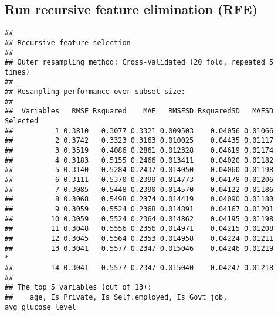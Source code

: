 \documentclass[
]{article}
\newenvironment{Shaded}{\begin{snugshade}}{\end{snugshade}}
\newcommand{\AttributeTok}[1]{\textcolor[rgb]{0.13,0.29,0.53}{#1}}
\newcommand{\DecValTok}[1]{\textcolor[rgb]{0.00,0.00,0.81}{#1}}
\newcommand{\FunctionTok}[1]{\textcolor[rgb]{0.13,0.29,0.53}{\textbf{#1}}}
\newcommand{\NormalTok}[1]{#1}
\newcommand{\OtherTok}[1]{\textcolor[rgb]{0.56,0.35,0.01}{#1}}
\newcommand{\SpecialCharTok}[1]{\textcolor[rgb]{0.81,0.36,0.00}{\textbf{#1}}}
\begin{document}
\hypertarget{run-recursive-feature-elimination-rfe}{%
\subsection{Run recursive feature elimination
(RFE)}\label{run-recursive-feature-elimination-rfe}}

\begin{Shaded}
\end{Shaded}

\begin{verbatim}
## 
## Recursive feature selection
## 
## Outer resampling method: Cross-Validated (20 fold, repeated 5 times) 
## 
## Resampling performance over subset size:
## 
##  Variables   RMSE Rsquared    MAE   RMSESD RsquaredSD   MAESD Selected
##          1 0.3810   0.3077 0.3321 0.009503    0.04056 0.01066         
##          2 0.3742   0.3323 0.3163 0.010025    0.04435 0.01117         
##          3 0.3519   0.4086 0.2861 0.012328    0.04619 0.01174         
##          4 0.3183   0.5155 0.2466 0.013411    0.04020 0.01182         
##          5 0.3140   0.5284 0.2437 0.014050    0.04060 0.01198         
##          6 0.3111   0.5370 0.2399 0.014773    0.04178 0.01206         
##          7 0.3085   0.5448 0.2390 0.014570    0.04122 0.01186         
##          8 0.3068   0.5498 0.2374 0.014419    0.04090 0.01180         
##          9 0.3059   0.5524 0.2368 0.014891    0.04167 0.01201         
##         10 0.3059   0.5524 0.2364 0.014862    0.04195 0.01198         
##         11 0.3048   0.5556 0.2356 0.014971    0.04215 0.01208         
##         12 0.3045   0.5564 0.2353 0.014958    0.04224 0.01211         
##         13 0.3041   0.5577 0.2347 0.015046    0.04246 0.01219        *
##         14 0.3041   0.5577 0.2347 0.015040    0.04247 0.01218         
## 
## The top 5 variables (out of 13):
##    age, Is_Private, Is_Self.employed, Is_Govt_job, avg_glucose_level
\end{verbatim}
\end{document}

